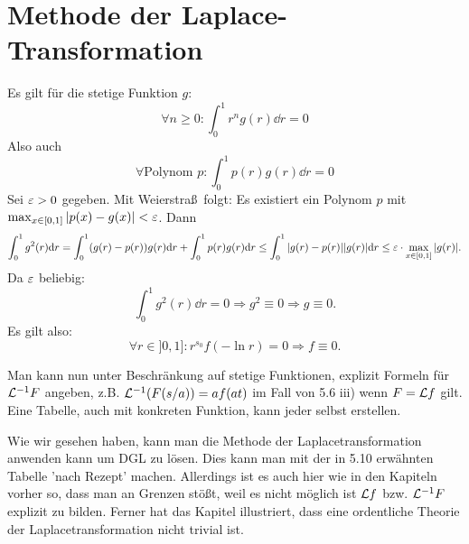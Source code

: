 \chapter{Methode der Laplace-Transformation}
%
%
%
%
%
%
%
%
%
\begin{beweis}
	Es gilt f\"ur die stetige Funktion $ g $:
	\[ \forall n\geq 0:\int_0^1 r^n g(r)\dd r=0 \]
	Also auch
	\[ \forall\text{Polynom }p:\int_0^1 p(r) g(r)\dd r=0 \]
	Sei $ \varepsilon>0 $ gegeben. Mit Weierstra\ss\ folgt: Es existiert ein Polynom $ p $ mit $ \max_{x\in[0,1]}|p(x)-g(x)|<\varepsilon $. Dann
	\begin{align*} \int_0^1 g^2(r)\mathrm d r=\int_0^1 (g(r)-p(r))g(r)\mathrm d r+\int_0^1 p(r)g(r)\mathrm d r\leq\int_0^1|g(r)-p(r)||g(r)|\mathrm d r\leq\varepsilon\cdot\max_{x\in[0,1]}|g(r)|. \end{align*}
	Da $ \varepsilon $ beliebig:
	\[ \int_0^1 g^2(r)\dd r=0\Rightarrow g^2\equiv 0\Rightarrow g\equiv 0. \]
	Es gilt also:
	\[ \forall r\in]0,1]: r^{s_0}f(-\ln r)=0\Rightarrow f\equiv 0. \]
\end{beweis}
\begin{bemerkung}
	Man kann nun unter Beschr\"ankung auf stetige Funktionen, explizit Formeln f\"ur $ \mathcal L^{-1}F $ angeben, z.B. $ \mathcal L^{-1}(F(s/a))=af(at) $ im Fall von 5.6 iii) wenn $ F=\mathcal L f $ gilt. Eine Tabelle, auch mit konkreten Funktion, kann jeder selbst erstellen.
\end{bemerkung}
\begin{bemerkung}
	Wie wir gesehen haben, kann man die Methode der Laplacetransformation anwenden kann um DGL zu l\"osen. Dies kann man mit der in 5.10 erw\"ahnten Tabelle 'nach Rezept' machen. Allerdings ist es auch hier wie in den Kapiteln vorher so, dass man an Grenzen st\"o\ss t, weil es nicht m\"oglich ist $ \mathcal L f $ bzw. $ \mathcal L^{-1}F $ explizit zu bilden. Ferner hat das Kapitel illustriert, dass eine ordentliche Theorie der Laplacetransformation nicht trivial ist.
\end{bemerkung}
